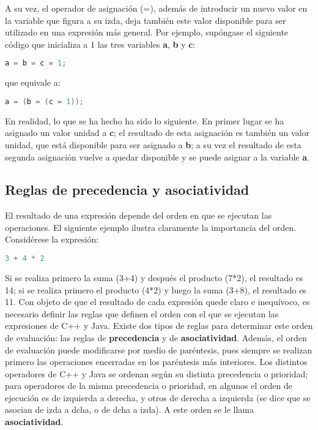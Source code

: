 A su vez, el operador de asignación (=), además de introducir un nuevo valor en la
variable que figura a su izda, deja también este valor disponible para ser utilizado en una
expresión más general. Por ejemplo, supóngase el siguiente código que inicializa a 1 las tres
variables \textbf{a}, \textbf{b} y \textbf{c}:

\begin{lstlisting}[language=C++]
a = b = c = 1;
\end{lstlisting}

que equivale a:

\begin{lstlisting}[language=C++]
a = (b = (c = 1));
\end{lstlisting}	

En realidad, lo que se ha hecho ha sido lo siguiente. En primer lugar se ha asignado un
valor unidad a \textbf{c}; el resultado de esta asignación es también un valor unidad, que está
disponible para ser asignado a \textbf{b}; a su vez el resultado de esta segunda asignación vuelve a
quedar disponible y se puede asignar a la variable \textbf{a}.

\subsection{Reglas de precedencia y asociatividad}
El resultado de una expresión depende del orden en que se ejecutan las operaciones. El
siguiente ejemplo ilustra claramente la importancia del orden. Considérese la expresión:

\begin{lstlisting}[language=C++]
3 + 4 * 2
\end{lstlisting}

Si se realiza primero la suma (3+4) y después el producto (7*2), el resultado es 14; si se
realiza primero el producto (4*2) y luego la suma (3+8), el resultado es 11. Con objeto de que
el resultado de cada expresión quede claro e inequívoco, es necesario definir las reglas que
definen el orden con el que se ejecutan las expresiones de C++ y Java. Existe dos tipos de reglas para
determinar este orden de evaluación: las reglas de \textbf{precedencia} y de \textbf{asociatividad}. Además, el
orden de evaluación puede modificarse por medio de paréntesis, pues siempre se realizan
primero las operaciones encerradas en los paréntesis más interiores. Los distintos operadores
de C++ y Java se ordenan según su distinta precedencia o prioridad; para operadores de la misma
precedencia o prioridad, en algunos el orden de ejecución es de izquierda a derecha, y otros de
derecha a izquierda (se dice que se asocian de izda a dcha, o de dcha a izda). A este orden se
le llama \textbf{asociatividad}.

